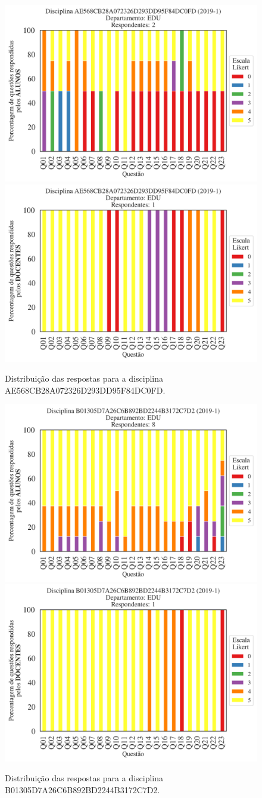\documentclass[a4paper,10pt]{article}
\begin{document}
\begin{figure}[h]
\centering
\includegraphics[width=0.485\linewidth]{analise_disciplina_departamento_EDU_ALUNO_TURMA_AE568CB28A072326D293DD95F84DC0FD.png}
\includegraphics[width=0.485\linewidth]{analise_disciplina_departamento_EDU_DOCENTE_TURMA_AE568CB28A072326D293DD95F84DC0FD.png}
\caption{\label{fig:analise_geral_departamento}                Distribuição das respostas para a disciplina AE568CB28A072326D293DD95F84DC0FD.}
\end{figure}
\begin{figure}[h]
\centering
\includegraphics[width=0.485\linewidth]{analise_disciplina_departamento_EDU_ALUNO_TURMA_B01305D7A26C6B892BD2244B3172C7D2.png}
\includegraphics[width=0.485\linewidth]{analise_disciplina_departamento_EDU_DOCENTE_TURMA_B01305D7A26C6B892BD2244B3172C7D2.png}
\caption{\label{fig:analise_geral_departamento}                Distribuição das respostas para a disciplina B01305D7A26C6B892BD2244B3172C7D2.}
\end{figure}
\end{document}
